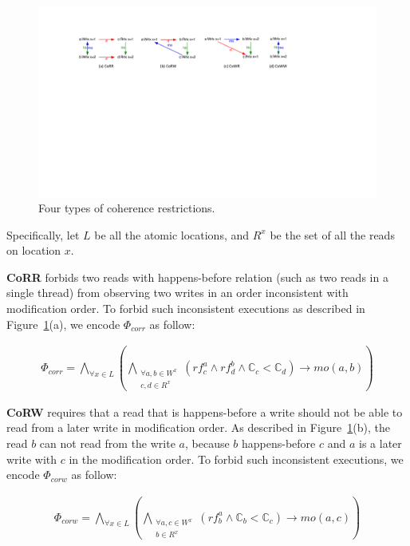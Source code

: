 \documentclass[preprint, numbers, 10pt]{sigplanconf}
\begin{document}
\begin{figure}%
\centering\includegraphics[scale=0.65]{CO.pdf} %
\caption{Four types of coherence restrictions.}
\label{fig:CO}
\end{figure}

Specifically, let $L$ be all the atomic locations, and $R^x$ be the set of 
all the reads on location $x$. 

\textbf{CoRR} forbids two reads with happens-before relation (such as two reads
in a single thread) from observing two writes in an order inconsistent with modification order. 
To forbid such inconsistent executions as described in Figure~\ref{fig:CO}(a), 
we encode $\Phi_{corr}$ as follow: 

\begin{equation}
\begin{aligned}
\Phi_{corr} = \bigwedge_{\forall x\in L}(\bigwedge_{\substack{\forall a,b\in W^x\\c,d\in R^x}} 
(rf^a_c\wedge rf^b_d\wedge\mathbb{C}_c<\mathbb{C}_d)\rightarrow mo(a,b))
\end{aligned}
\end{equation} 

\textbf{CoRW} requires that a read that is happens-before a 
write should not be able to read from a later write in modification order.
As described in Figure~\ref{fig:CO}(b), the read $b$ can not read from
the write $a$, because $b$ happens-before $c$ and $a$ is a later write 
with $c$ in the modification order. To forbid such inconsistent executions, we 
encode $\Phi_{corw}$ as follow: 

\begin{equation}
\begin{aligned}
\Phi_{corw} = \bigwedge_{\forall x\in L}(\bigwedge_{\substack{\forall a,c\in W^x\\b\in R^x}}
(rf^a_b\wedge\mathbb{C}_b<\mathbb{C}_c)\rightarrow mo(a,c))
\end{aligned}
\end{equation} 
\end{document}

